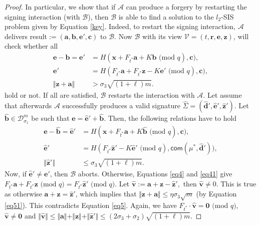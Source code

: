 \documentclass[runningheads]{llncs}
\def\cal{\mathcal}
\def\bf{\mathbf}
\begin{document}
\begin{proof}
In particular, we show that if $\mathcal{A}$ can produce a forgery by restarting
the signing interaction (with $\mathcal{B}$), 
then $\mathcal{B}$ is able to find a solution to the $l_2$-\textsf{SIS} problem  given by Equation \eqref{key}. 
Indeed, to restart the signing interaction,  
$\mathcal{A}$  delivers \textsf{result}$:=(\mathbf{a}, \mathbf{b}, \mathbf{e}', \mathbf{c})$ to $\mathcal{B}$.  
Now $\mathcal{B}$ with its view $\mathcal{V}=(t, \mathbf{r},\mathbf{e}, \mathbf{z})$, will check whether all
	\begin{align}
	\mathbf{e}-\mathbf{b}=\mathbf{e}'&=H(\mathbf{x}+F_{t^*}\mathbf{a}+K\mathbf{b} \text{ (mod } q), \bf{c})\label{eq3},\\
	\mathbf{e}'&=H(F_{t^*}\mathbf{a}+F_{t^*}\mathbf{z}-K\bf{e}' \text{ (mod } q), \bf{c}) \label{eq4},\\
	\Vert \mathbf{z}+\mathbf{a} \Vert &> \sigma_3 \sqrt{(1+\ell)m}. \label{eq5}
	\end{align}
hold or not. If all are satisfied, $\mathcal{B}$ restarts the interaction with $\mathcal{A}$. 
Let assume that afterwards $\mathcal{A}$ successfully produces a 
valid signature $ \widehat{\Sigma}=(\widehat{\mathbf{d}}', \widehat{\mathbf{e}}',\widehat{\mathbf{z}}')$. 
Let  $\widehat{\mathbf{b}} \in \mathcal{D}_{\sigma_1}^m$ be such that $\mathbf{e}=\widehat{\mathbf{e}}'+\widehat{\mathbf{b}}$. 
Then, the following relations have to hold
\begin{align}
	\mathbf{e}-\widehat{\mathbf{b}}=\widehat{\mathbf{e}}'&=H(\mathbf{x}+F_{t^*}\mathbf{a}+K \widehat{\mathbf{b}} \text{ (mod } q), \bf{c})\label{eq31},\\
	\widehat{\mathbf{e}}'&=H(F_{t^*}\widehat{\mathbf{z}}'-K\widehat{\mathbf{e}}'\text{ (mod } q), \mathsf{com}(\mu^*, \widehat{\mathbf{d}}')) \label{eq41},\\
	\Vert \widehat{\mathbf{z}}'\Vert &\leq \sigma_3\sqrt{(1+\ell)m}. \label{eq51}
\end{align}
Now, if $\widehat{\mathbf{e}}'\neq \mathbf{e}'$, then $\cal{B}$ aborts. 
Otherwise, Equations \eqref{eq4} and \eqref{eq41} give  
$F_{t^*}\mathbf{a}+F_{t^*}\mathbf{z} \text{ (mod } q)=F_{t^*}\widehat{\mathbf{z}}' \text{ (mod } q).$
Let $\widehat{\bf{v}}:=\mathbf{a}+\mathbf{z} -\widehat{\mathbf{z}}',$ then $\widehat{\bf{v}} \neq 0$.
This is true as otherwise 
$ \mathbf{a}+\mathbf{z}=\widehat{\mathbf{z}}' $, which implies that
$\Vert \mathbf{z}+\mathbf{a} \Vert \leq \eta \sigma_3 \sqrt{m} $ (by Equation \eqref{eq51}). 
This contradicts Equation \eqref{eq5}. 
Again, we have $F_{t^*}\cdot \widehat{\bf{v}} = \textbf{0} \text{ (mod } q)$,  
$\widehat{\bf{v}}\neq \mathbf{0}$ and 
$\Vert\widehat{\bf{v}} \Vert \leq \Vert\mathbf{a} \Vert+\Vert\mathbf{z} \Vert+\Vert\widehat{\mathbf{z}}' \Vert \leq (2\sigma_3+\sigma_2)\sqrt{(1+\ell)m}$.  
	

\end{proof}
\end{document}
